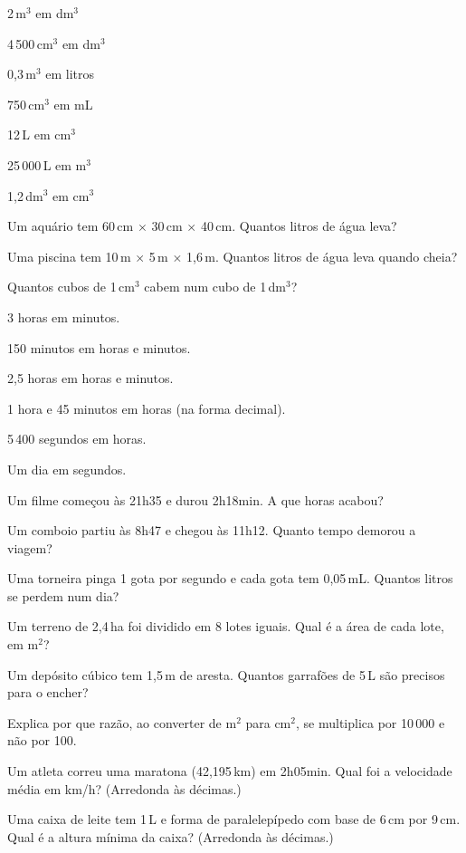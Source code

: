 \documentclass[12pt]{article}
\begin{document}
\begin{exercicios}
  \item 2\,m$^3$ em dm$^3$
  \item 4\,500\,cm$^3$ em dm$^3$
  \item 0,3\,m$^3$ em litros
  \item 750\,cm$^3$ em mL
  \item 12\,L em cm$^3$
  \item 25\,000\,L em m$^3$
  \item 1,2\,dm$^3$ em cm$^3$
  \item Um aquário tem 60\,cm $\times$ 30\,cm $\times$ 40\,cm. Quantos litros de água leva?
  \item Uma piscina tem 10\,m $\times$ 5\,m $\times$ 1,6\,m. Quantos litros de água leva quando cheia?
  \item Quantos cubos de 1\,cm$^3$ cabem num cubo de 1\,dm$^3$?
\end{exercicios}

\begin{exercicios}
  \item 3 horas em minutos.
  \item 150 minutos em horas e minutos.
  \item 2,5 horas em horas e minutos.
  \item 1 hora e 45 minutos em horas (na forma decimal).
  \item 5\,400 segundos em horas.
  \item Um dia em segundos.
  \item Um filme começou às 21h35 e durou 2h18min. A que horas acabou?
  \item Um comboio partiu às 8h47 e chegou às 11h12. Quanto tempo demorou a viagem?
\end{exercicios}

\begin{exercicios}
  \item Uma torneira pinga 1 gota por segundo e cada gota tem 0,05\,mL. Quantos litros se perdem num dia?
  \item Um terreno de 2,4\,ha foi dividido em 8 lotes iguais. Qual é a área de cada lote, em m$^2$?
  \item Um depósito cúbico tem 1,5\,m de aresta. Quantos garrafões de 5\,L são precisos para o encher?
  \item Explica por que razão, ao converter de m$^2$ para cm$^2$, se multiplica por 10\,000 e não por 100.
  \item Um atleta correu uma maratona (42,195\,km) em 2h05min. Qual foi a velocidade média em km/h? (Arredonda às décimas.)
  \item Uma caixa de leite tem 1\,L e forma de paralelepípedo com base de 6\,cm por 9\,cm. Qual é a altura mínima da caixa? (Arredonda às décimas.)
\end{exercicios}
\end{document}
